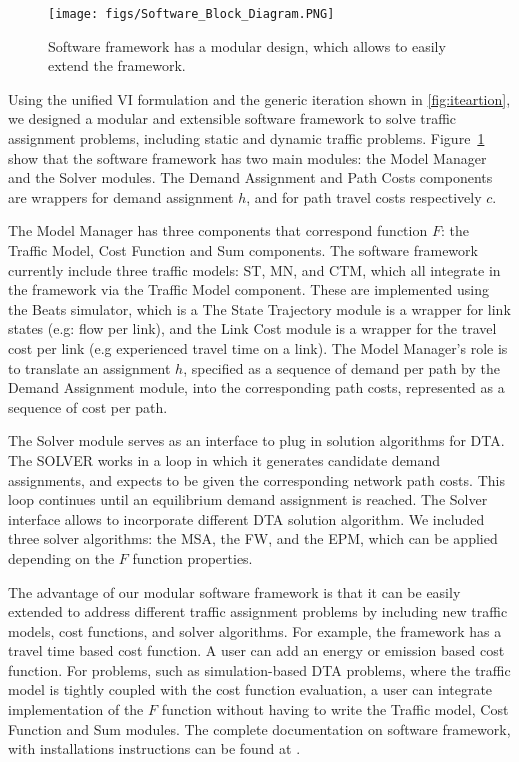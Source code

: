 \begin{figure}[h]
    \centering
    \texttt{[image: figs/Software\_Block\_Diagram.PNG]}
    \caption{Software framework has a modular design, which allows to easily extend the framework.}
    \label{fig:Block_Diagram}
\end{figure}

Using the unified VI formulation and the generic iteration shown in \ref{fig:iteartion}, we designed a modular and extensible software framework to solve traffic assignment problems, including static and dynamic traffic problems. Figure~\ref{fig:Block_Diagram} show that the software framework has two main modules: the Model Manager and the Solver modules. The Demand Assignment and Path Costs components are wrappers for demand assignment $h$, and for path travel costs respectively $c$.

The Model Manager has three components that correspond function $F$: the Traffic Model, Cost Function and Sum components. The software framework currently include three traffic models: ST, MN, and CTM, which all integrate in the framework via the Traffic Model component. These are implemented using the Beats simulator, which is a  The State Trajectory module is a wrapper for link states (e.g: flow per link), and the Link Cost module is a wrapper for the travel cost per link (e.g experienced travel time on a link). The Model Manager's role is to translate an assignment $h$, specified as a sequence of demand per path by the Demand Assignment module, into the corresponding path costs, represented as a sequence of cost per path.

The Solver module serves as an interface to plug in solution algorithms for DTA. The SOLVER works in a loop in which it generates candidate demand assignments, and expects to be given the corresponding network path costs. This loop continues until an equilibrium demand assignment is reached. The Solver interface allows to incorporate different DTA solution algorithm. We included three solver algorithms: the MSA, the FW, and the EPM, which can be applied depending on the $F$ function properties. 

The advantage of our modular software framework is that it can be easily extended to address different traffic assignment problems by including new traffic models, cost functions, and solver algorithms. For example, the framework has a travel time based cost function. A user can add an energy or emission based cost function. For problems, such as simulation-based DTA problems, where the traffic model is tightly coupled with the cost function evaluation, a user can integrate implementation of the $F$ function without having to write the Traffic model, Cost Function and Sum modules. The complete documentation on software framework, with installations instructions can be found at \cite{ta_solver}.